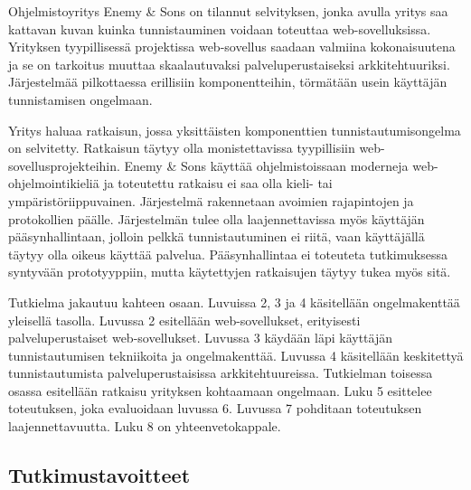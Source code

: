 Ohjelmistoyritys Enemy \& Sons on tilannut selvityksen, jonka avulla yritys saa kattavan kuvan kuinka tunnistauminen voidaan toteuttaa web-sovelluksissa. Yrityksen tyypillisessä projektissa web-sovellus saadaan valmiina kokonaisuutena ja se on tarkoitus muuttaa skaalautuvaksi palveluperustaiseksi arkkitehtuuriksi. Järjestelmää pilkottaessa erillisiin komponentteihin, törmätään usein käyttäjän tunnistamisen ongelmaan.

Yritys haluaa ratkaisun, jossa yksittäisten komponenttien tunnistautumisongelma on selvitetty. Ratkaisun täytyy olla monistettavissa tyypillisiin web-sovellusprojekteihin. Enemy \& Sons käyttää ohjelmistoissaan moderneja web-ohjelmointikieliä ja toteutettu ratkaisu ei saa olla kieli- tai ympäristöriippuvainen. Järjestelmä rakennetaan avoimien rajapintojen ja protokollien päälle. Järjestelmän tulee olla laajennettavissa myös käyttäjän pääsynhallintaan, jolloin pelkkä tunnistautuminen ei riitä, vaan käyttäjällä täytyy olla oikeus käyttää palvelua. Pääsynhallintaa ei toteuteta tutkimuksessa syntyvään prototyyppiin, mutta käytettyjen ratkaisujen täytyy tukea myös sitä.

Tutkielma jakautuu kahteen osaan. Luvuissa 2, 3 ja 4 käsitellään ongelmakenttää yleisellä tasolla. Luvussa 2 esitellään web-sovellukset, erityisesti palveluperustaiset web-sovellukset. Luvussa 3 käydään läpi käyttäjän tunnistautumisen tekniikoita ja ongelmakenttää. Luvussa 4 käsitellään keskitettyä tunnistautumista palveluperustaisissa arkkitehtuureissa. Tutkielman toisessa osassa esitellään ratkaisu yrityksen kohtaamaan ongelmaan. Luku 5 esittelee toteutuksen, joka evaluoidaan luvussa 6. Luvussa 7 pohditaan toteutuksen laajennettavuutta. Luku 8 on yhteenvetokappale.


\subsection{Tutkimustavoitteet}

